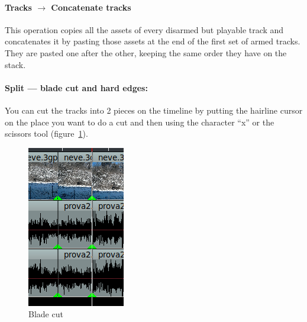 \paragraph{Tracks $\rightarrow$ Concatenate tracks} This operation copies all the assets of every disarmed but playable
track and concatenates it by pasting those assets at the end of the first set of armed tracks. They are
pasted one after the other, keeping the same order they have on the stack.

\paragraph{Split --- blade cut and hard edges:} You can cut the tracks into 2 pieces on the timeline by putting the hairline cursor on the place you want to do a cut and then using the character “x” or the scissors tool (figure~\ref{fig:cut}). 

\begin{figure}
    \vspace{1ex}
    \centering
    \includegraphics[width=0.9\linewidth]{images/cut.png}
    \caption{Blade cut}
    \label{fig:cut}
\end{figure}

